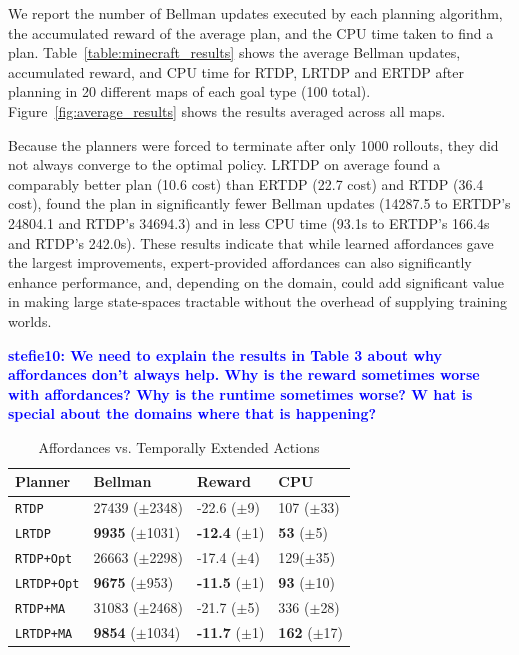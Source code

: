 \documentclass[letterpaper]{article}
\newcommand{\stnote}[1]{\textcolor{Blue}{\textbf{stefie10: #1}}}
\newcommand{\ra}[1]{\renewcommand{\arraystretch}{#1}} %
\begin{document}
We report the number of Bellman updates executed by each planning
algorithm, the accumulated reward of the average plan, and the CPU
time taken to find a plan. Table~\ref{table:minecraft_results} shows
the average Bellman updates, accumulated reward, and CPU time for
RTDP, LRTDP and ERTDP after planning in 20 different maps of each goal
type (100 total). Figure~\ref{fig:average_results} shows the results
averaged across all maps.

Because the planners were forced to terminate after only 1000
rollouts, they did not always converge to the optimal policy. LRTDP on
average found a comparably better plan (10.6 cost) than ERTDP (22.7
cost) and RTDP (36.4 cost), found the plan in significantly fewer
Bellman updates (14287.5 to ERTDP's 24804.1 and RTDP's 34694.3) and in
less CPU time (93.1s to ERTDP's 166.4s and RTDP's 242.0s).  These
results indicate that while learned affordances gave the largest
improvements, expert-provided affordances can also significantly
enhance performance, and, depending on the domain, could add
significant value in making large state-spaces tractable without the
overhead of supplying training worlds.

\stnote{We need to explain the results in Table 3 about why
  affordances don't always help.  Why is the reward sometimes worse
  with affordances?  Why is the runtime sometimes worse? W hat is
  special about the domains where that is happening?}


\begin{table}[b]
\ra{1.25}
\small
\begin{tabular}{@{}llll@{}}\toprule
Planner & Bellman & Reward & CPU \\ \midrule
\texttt{RTDP}   			&	27439 ($\pm$2348)		&	-22.6 ($\pm$9)		& 107 ($\pm$33) \\
\texttt{LRTDP} 			& 	{\bf 9935} ($\pm$1031)	&	{\bf -12.4} ($\pm$1)& {\bf 53} ($\pm$5) \\ \hline
\texttt{RTDP+Opt}  		&	26663 ($\pm$2298)		&	-17.4 ($\pm$4) 		& 129($\pm$35) \\
\texttt{LRTDP+Opt} 		& 	{\bf 9675} ($\pm$953)	&	{\bf -11.5} ($\pm$1)	&{\bf 93} ($\pm$10) \\ \hline
\texttt{RTDP+MA}  		&	31083 ($\pm$2468)		&	-21.7	 ($\pm$5)		&336 ($\pm$28) \\
\texttt{LRTDP+MA}  		& 	{\bf 9854} ($\pm$1034)	&	{\bf -11.7} ($\pm$1)	&{\bf 162} ($\pm$17) \\ %
\bottomrule
\end{tabular}
\caption{Affordances vs. Temporally Extended Actions}
\label{table:temp_ext_act_results}
\end{table}
\end{document}
